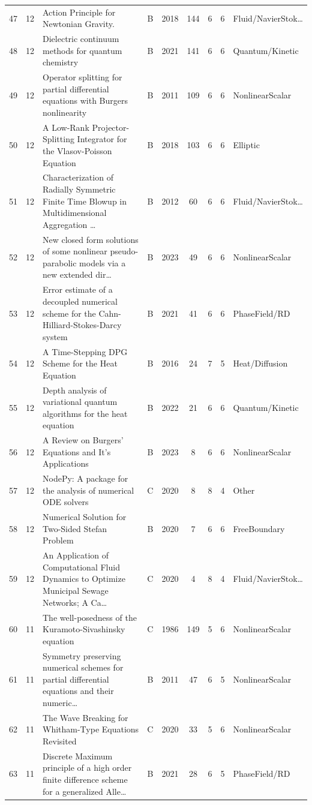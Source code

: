 \documentclass[10pt,letterpaper]{article}
\begin{document}
\begin{center}
\begin{longtable}{rrp{}cccccp{}}
47 & 12 & Action Principle for Newtonian Gravity. & B & 2018 & 144 & 6 & 6 & Fluid/NavierStok… \\
48 & 12 & Dielectric continuum methods for quantum chemistry & B & 2021 & 141 & 6 & 6 & Quantum/Kinetic \\
49 & 12 & Operator splitting for partial differential equations with Burgers nonlinearity & B & 2011 & 109 & 6 & 6 & NonlinearScalar \\
50 & 12 & A Low-Rank Projector-Splitting Integrator for the Vlasov-Poisson Equation & B & 2018 & 103 & 6 & 6 & Elliptic \\
51 & 12 & Characterization of Radially Symmetric Finite Time Blowup in Multidimensional Aggregation … & B & 2012 & 60 & 6 & 6 & Fluid/NavierStok… \\
52 & 12 & New closed form solutions of some nonlinear pseudo-parabolic models via a new extended dir… & B & 2023 & 49 & 6 & 6 & NonlinearScalar \\
53 & 12 & Error estimate of a decoupled numerical scheme for the Cahn-Hilliard-Stokes-Darcy system & B & 2021 & 41 & 6 & 6 & PhaseField/RD \\
54 & 12 & A Time-Stepping DPG Scheme for the Heat Equation & B & 2016 & 24 & 7 & 5 & Heat/Diffusion \\
55 & 12 & Depth analysis of variational quantum algorithms for the heat equation & B & 2022 & 21 & 6 & 6 & Quantum/Kinetic \\
56 & 12 & A Review on Burgers' Equations and It's Applications & B & 2023 & 8 & 6 & 6 & NonlinearScalar \\
57 & 12 & NodePy: A package for the analysis of numerical ODE solvers & C & 2020 & 8 & 8 & 4 & Other \\
58 & 12 & Numerical Solution for Two-Sided Stefan Problem & B & 2020 & 7 & 6 & 6 & FreeBoundary \\
59 & 12 & An Application of Computational Fluid Dynamics to Optimize Municipal Sewage Networks; A Ca… & C & 2020 & 4 & 8 & 4 & Fluid/NavierStok… \\
60 & 11 & The well-posedness of the Kuramoto-Sivashinsky equation & C & 1986 & 149 & 5 & 6 & NonlinearScalar \\
61 & 11 & Symmetry preserving numerical schemes for partial differential equations and their numeric… & B & 2011 & 47 & 6 & 5 & NonlinearScalar \\
62 & 11 & The Wave Breaking for Whitham-Type Equations Revisited & C & 2020 & 33 & 5 & 6 & NonlinearScalar \\
63 & 11 & Discrete Maximum principle of a high order finite difference scheme for a generalized Alle… & B & 2021 & 28 & 6 & 5 & PhaseField/RD \\

\end{longtable}
\end{center}
\end{document}
